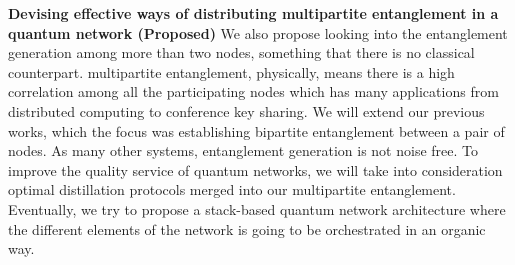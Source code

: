 \vspace{6pt}\noindent \textbf{Devising effective ways of distributing multipartite entanglement in a quantum network (Proposed)} 
We also propose looking into the entanglement generation among more than two nodes, something that there is no classical counterpart. 
multipartite entanglement, physically, means there is a high correlation among all the participating nodes which has many applications from distributed computing to conference key sharing.
We will extend our previous works, which the focus was establishing bipartite entanglement between a pair of nodes.
As many other systems, entanglement generation is not noise free. To improve the quality service of quantum networks, we will take into consideration optimal distillation protocols merged into our multipartite entanglement.
Eventually, we try to propose a stack-based quantum network architecture where the different elements of the network is going to be orchestrated in an organic way.


